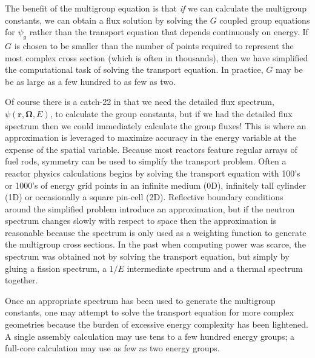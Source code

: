 \documentclass[11pt]{article}
\renewcommand\vec{\mathbf}
\begin{document}
The benefit of the multigroup equation is that \emph{if} we can calculate the multigroup constants, we can obtain a flux solution by solving the \(G\) coupled group equations for \(\psi_g\) rather than the transport equation that depends continuously on energy.  If \(G\) is chosen to be smaller than the number of points required to represent the most complex cross section (which is often in thousands), then we have simplified the computational task of solving the transport equation.  In practice, \(G\) may be be as large as a few hundred to as few as two.

Of course there is a catch-22 in that we need the detailed flux spectrum, \(\psi(\vec{r},\vec{\Omega},E)\), to calculate the group constants, but if we had the detailed flux spectrum then we could immediately calculate the group fluxes!  This is where an approximation is leveraged to maximize accuracy in the energy variable at the expense of the spatial variable.  Because most reactors feature regular arrays of fuel rods, symmetry can be used to simplify the transport problem.  Often a reactor physics calculations begins by solving the transport equation with 100's or 1000's of energy grid points in an infinite medium (0D), infinitely tall cylinder (1D) or occasionally a square pin-cell (2D).  Reflective boundary conditions around the simplified problem introduce an approximation, but if the neutron spectrum changes slowly with respect to space then the approximation is reasonable because the spectrum is only used as a weighting function to generate the multigroup cross sections.  In the past when computing power was scarce, the spectrum was obtained not by solving the transport equation, but simply by gluing a fission spectrum, a \(1/E\) intermediate spectrum and a thermal spectrum together.

Once an appropriate spectrum has been used to generate the multigroup constants, one may attempt to solve the transport equation for more complex geometries because the burden of excessive energy complexity has been lightened.  A single assembly calculation may use tens to a few hundred energy groups; a full-core calculation may use as few as two energy groups.
\end{document}
